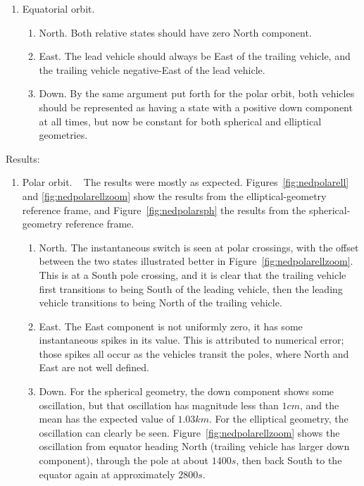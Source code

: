 \begin{description}
\begin{enumerate}
 \item {Equatorial orbit.}  
  \begin{enumerate}
   \item{North.} Both relative states should have zero North component.
   \item {East.} The lead vehicle should always be East of the trailing vehicle, and the trailing vehicle negative-East of the lead vehicle.
   \item {Down.} By the same argument put forth for the polar orbit, both vehicles should be represented as having a state with a positive down component at all times, but now be constant for both spherical and elliptical geometries.  
  \end{enumerate}




\end{enumerate}


\item{Results:}
\begin{enumerate}
 \item {Polar orbit.} \ \newline
   The results were mostly as expected.  Figures~\ref{fig:nedpolarell} and \ref{fig:nedpolarellzoom} show the results from the elliptical-geometry reference frame, and Figure~\ref{fig:nedpolarsph} the results from the spherical-geometry reference frame.
  \begin{enumerate}
   \item{North.} The instantaneous switch is seen at polar crossings, with the offset between the two states illustrated better in Figure~\ref{fig:nedpolarellzoom}.  This is at a South pole crossing, and it is clear that the trailing vehicle first transitions to being South of the leading vehicle, then the leading vehicle transitions to being North of the trailing vehicle.
   \item {East.}  The East component is not uniformly zero, it has some instantaneous spikes in its value.  This is attributed to numerical error; those spikes all occur as the vehicles transit the poles, where North and East are not well defined.  
   \item {Down.} For the spherical geometry, the down component shows some oscillation, but that oscillation has magnitude less than $1 cm$, and the mean has the expected value of $1.03 km$.  For the elliptical geometry, the oscillation can clearly be seen.  Figure~\ref{fig:nedpolarellzoom} shows the oscillation from equator heading North (trailing vehicle has larger down component), through the pole at about $1400 s$, then back South to the equator again at approximately $2800 s$.
  \end{enumerate}


\end{enumerate}
\end{description}
